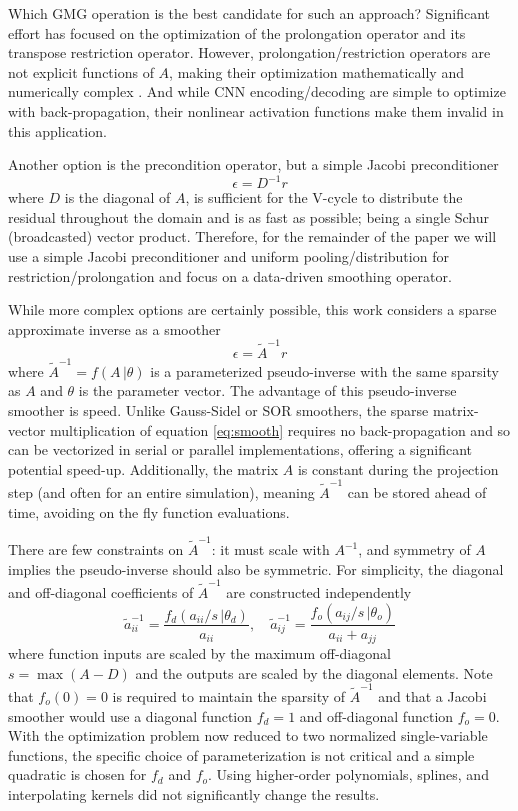 \documentclass[review]{elsarticle}
\begin{document}
Which GMG operation is the best candidate for such an approach? Significant effort has focused on the optimization of the prolongation operator and its transpose restriction operator. However, prolongation/restriction operators are not explicit functions of $A$, making their optimization mathematically and numerically complex \cite{KATRUTSA2020112524,greenfeld2019learning}. And while CNN encoding/decoding are simple to optimize with back-propagation, their nonlinear activation functions make them invalid in this application. 

Another option is the precondition operator, but a simple Jacobi preconditioner
\begin{equation}
    \epsilon = D^{-1}r
\end{equation}
where $D$ is the diagonal of $A$, is sufficient for the V-cycle to distribute the residual throughout the domain and is as fast as possible; being a single Schur (broadcasted) vector product. Therefore, for the remainder of the paper we will use a simple Jacobi preconditioner and uniform pooling/distribution for restriction/prolongation and focus on a data-driven smoothing operator.

While more complex options are certainly possible, this work considers a sparse approximate inverse as a smoother
\begin{equation}\label{eq:smooth}
    \epsilon = \tilde A^{-1}r
\end{equation}
where $\tilde A^{-1}=f(A\,|\theta)$ is a parameterized pseudo-inverse with the same sparsity as $A$ and $\theta$ is the parameter vector. The advantage of this pseudo-inverse smoother is speed. Unlike Gauss-Sidel or SOR smoothers, the sparse matrix-vector multiplication of equation \ref{eq:smooth} requires no back-propagation and so can be vectorized in serial or parallel implementations, offering a significant potential speed-up. Additionally, the matrix $A$ is constant during the projection step (and often for an entire simulation), meaning $\tilde A^{-1}$ can be stored ahead of time, avoiding on the fly function evaluations.

There are few constraints on $\tilde A^{-1}$: it must scale with $A^{-1}$, and symmetry of $A$ implies the pseudo-inverse should also be symmetric. For simplicity, the diagonal and off-diagonal coefficients of $\tilde A^{-1}$ are constructed independently 
\begin{equation}\label{eq:approxinv}
    \tilde a^{-1}_{ii} = \frac{f_d(a_{ii}/s\,|\theta_d)}{a_{ii}} , \quad
    \tilde a^{-1}_{ij} = \frac{f_o(a_{ij}/s\,|\theta_o)}{a_{ii}+a_{jj}}
\end{equation}
where function inputs are scaled by the maximum off-diagonal $s=\max(A-D)$ and the outputs are scaled by the diagonal elements. Note that $f_o(0)=0$ is required to maintain the sparsity of $\tilde A^{-1}$ and that a Jacobi smoother would use a diagonal function $f_d=1$ and off-diagonal function $f_o=0$. With the optimization problem now reduced to two normalized single-variable functions, the specific choice of parameterization is not critical and a simple quadratic is chosen for $f_d$ and $f_o$. Using higher-order polynomials, splines, and interpolating kernels did not significantly change the results.
\end{document}
